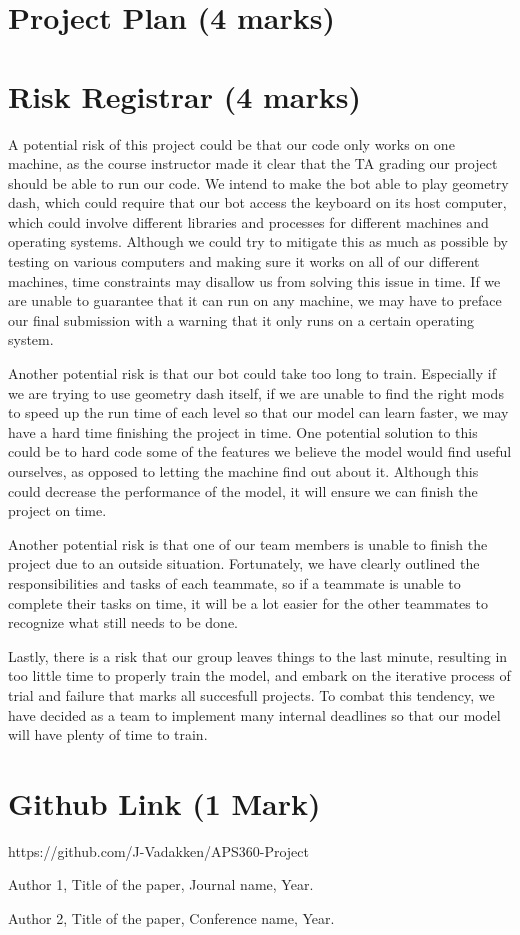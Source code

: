 \documentclass{article}
\begin{document}
\section{Project Plan (4 marks)}

\section{Risk Registrar (4 marks)}
A potential risk of this project could be that our code only works on one 
machine, as the course instructor made it clear that the TA grading our 
project should be able to run our code. We intend to make the bot able to 
play geometry dash, which could require that our bot access the keyboard on 
its host computer, which could involve different libraries and processes for 
different machines and operating systems. Although we could try to mitigate 
this as much as possible by testing on various computers and making sure it 
works on all of our different machines, time constraints may disallow us from 
solving this issue in time. If we are unable to guarantee that it can run on 
any machine, we may have to preface our final submission with a warning that 
it only runs on a certain operating system. 

Another potential risk is that our bot could take too long to train. 
Especially if we are trying to use geometry dash itself, if we are unable to 
find the right mods to speed up the run time of each level so that our model 
can learn faster, we may have a hard time finishing the project in time. One 
potential solution to this could be to hard code some of the features we 
believe the model would find useful ourselves, as opposed to letting the 
machine find out about it. Although this could decrease the performance of 
the model, it will ensure we can finish the project on time. 

Another potential risk is that one of our team members is unable to finish 
the project due to an outside situation. Fortunately, we have clearly 
outlined the responsibilities and tasks of each teammate, so if a teammate is 
unable to complete their tasks on time, it will be a lot easier for the other 
teammates to recognize what still needs to be done.

Lastly, there is a risk that our group leaves things to the last minute, 
resulting in too little time to properly train the model, and embark on the 
iterative process of trial and failure that marks all succesfull projects. To 
combat this tendency, we have decided as a team to implement many internal 
deadlines so that our model will have plenty of time to train.

\section{Github Link (1 Mark)}
https://github.com/J-Vadakken/APS360-Project

\begin{thebibliography}{9}
Author 1, Title of the paper, Journal name, Year.

Author 2, Title of the paper, Conference name, Year.
\end{thebibliography}
\end{document}
